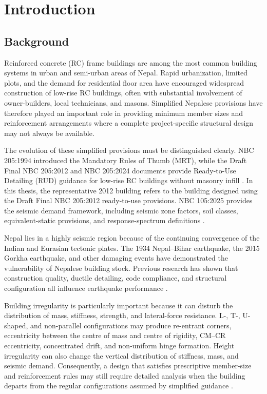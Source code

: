 \chapter[INTRODUCTION]{Introduction}

\section{Background}
Reinforced concrete (RC) frame buildings are among the most common building systems in urban and semi-urban areas of Nepal. Rapid urbanization, limited plots, and the demand for residential floor area have encouraged widespread construction of low-rise RC buildings, often with substantial involvement of owner-builders, local technicians, and masons. Simplified Nepalese provisions have therefore played an important role in providing minimum member sizes and reinforcement arrangements where a complete project-specific structural design may not always be available.

The evolution of these simplified provisions must be distinguished clearly. NBC 205:1994 introduced the Mandatory Rules of Thumb (MRT), while the Draft Final NBC 205:2012 and NBC 205:2024 documents provide Ready-to-Use Detailing (RUD) guidance for low-rise RC buildings without masonry infill \cite{nbc205_1994,nbc205_2012,nbc205_2024}. In this thesis, the representative 2012 building refers to the building designed using the Draft Final NBC 205:2012 ready-to-use provisions. NBC 105:2025 provides the seismic demand framework, including seismic zone factors, soil classes, equivalent-static provisions, and response-spectrum definitions \cite{nbc105_2025}.

Nepal lies in a highly seismic region because of the continuing convergence of the Indian and Eurasian tectonic plates. The 1934 Nepal--Bihar earthquake, the 2015 Gorkha earthquake, and other damaging events have demonstrated the vulnerability of Nepalese building stock. Previous research has shown that construction quality, ductile detailing, code compliance, and structural configuration all influence earthquake performance \cite{thapa2013psha,parajuli2015gorkha,chaulagain2013seismic}.

Building irregularity is particularly important because it can disturb the distribution of mass, stiffness, strength, and lateral-force resistance. L-, T-, U-shaped, and non-parallel configurations may produce re-entrant corners, eccentricity between the centre of mass and centre of rigidity, CM--CR eccentricity, concentrated drift, and non-uniform hinge formation. Height irregularity can also change the vertical distribution of stiffness, mass, and seismic demand. Consequently, a design that satisfies prescriptive member-size and reinforcement rules may still require detailed analysis when the building departs from the regular configurations assumed by simplified guidance \cite{cimellaro2014bidirectional,destefano2014pushover,jadhav2025study}.

